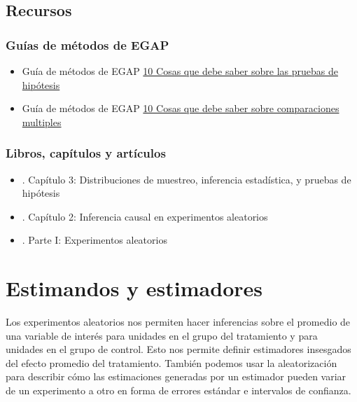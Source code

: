 \documentclass[
  12pt,
  spanish,
]{book}
\begin{document}
\hypertarget{recursos-3}{%
\section{Recursos}\label{recursos-3}}

\hypertarget{guuxedas-de-muxe9todos-de-egap-2}{%
\subsection{Guías de métodos de EGAP}\label{guuxedas-de-muxe9todos-de-egap-2}}

\begin{itemize}
\item
  Guía de métodos de EGAP \href{https://egap.org/resource/10-things-to-know-about-hypothesis-testing/}{10 Cosas que debe saber sobre las pruebas de hipótesis}
\item
  Guía de métodos de EGAP \href{https://egap.org/resource/10-things-to-know-about-multiple-comparisons/}{10 Cosas que debe saber sobre comparaciones multiples}
\end{itemize}

\hypertarget{libros-capuxedtulos-y-artuxedculos-2}{%
\subsection{Libros, capítulos y artículos}\label{libros-capuxedtulos-y-artuxedculos-2}}

\begin{itemize}
\item
  \autocite{gerber_field_2012}. Capítulo 3: Distribuciones de muestreo, inferencia estadística, y pruebas de hipótesis
\item
  \autocite{rosenbaum2010design}. Capítulo 2: Inferencia causal en experimentos aleatorios
\item
  \autocite{rosenbaum2017observation}. Parte I: Experimentos aleatorios
\end{itemize}

\hypertarget{estimandos-y-estimadores}{%
\chapter{Estimandos y estimadores}\label{estimandos-y-estimadores}}

Los experimentos aleatorios nos permiten hacer inferencias sobre el promedio de una variable de interés para unidades en el grupo del tratamiento y para unidades en el grupo de control. Esto nos permite definir estimadores insesgados del efecto promedio del tratamiento. También podemos usar la aleatorización para describir cómo las estimaciones generadas por un estimador pueden variar de un experimento a otro en forma de errores estándar e intervalos de confianza.
\end{document}
